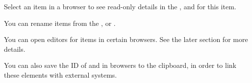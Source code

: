 Select an item in a browser to see read-only details in the \gdpropview{}, \gddatasetsview{} and \gdcompnamesview{} for this item. 

You can rename items from the \gdtestcasebrowser{}, \gdtestsuitebrowser{} or 
\gdcompnamebrowser{}. 

You can open editors for items in certain browsers. See the later section 
 for more details.

You can also save the ID of \gdcases{} and \gdsuites{} in browsers to the clipboard, in order to link these elements with external systems. 
